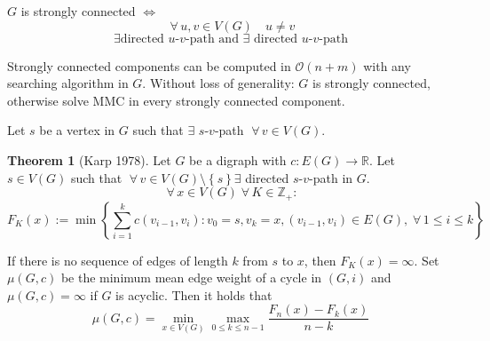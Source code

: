 \documentclass[a4paper]{article}
\theoremstyle{definition}
\newtheorem{theorem}{Theorem}
\newcommand{\set}[1]{\left\{#1\right\}}
\newcommand{\gath}[2]{$#1$-$#2$-path} %
\newcommand{\fall}{\;\forall\,}
\begin{document}
 $G$ is strongly connected $\Leftrightarrow$
\[
  \fall u, v \in V(G) \quad u \neq v
\] \[
  \exists \text{directed \gath uv and } \exists \text{ directed \gath uv}
\]

Strongly connected components can be computed in $\mathcal{O}(n + m)$ with any searching algorithm in $G$. Without loss of generality: $G$ is strongly connected, otherwise solve MMC in every strongly connected component.

Let $s$ be a vertex in $G$ such that $\exists$ \gath sv $\fall v \in V(G)$.

\begin{theorem}[Karp 1978]
  \label{satz-3.10}
  Let $G$ be a digraph with $c: E(G) \rightarrow \mathbb{R}$. Let $s \in V(G)$ such that $\fall v \in V(G) \setminus \set{s} \exists$ directed \gath sv in $G$.
  \[
    \fall x \in V(G) \fall K \in \mathbb{Z}_+:
  \] \[
    F_K(x) := \min\set{
      \sum_{i=1}^k c(v_{i-1}, v_i):
        v_0 = s, v_k = x, (v_{i-1}, v_i) \in E(G),
        \fall 1 \leq i \leq k
    }
  \]

  If there is no sequence of edges of length $k$ from $s$ to $x$, then $F_K(x) = \infty$.
  Set $\mu(G, c)$ be the minimum mean edge weight of a cycle in $(G, i)$ and $\mu(G, c) = \infty$ if $G$ is acyclic. Then it holds that
  \[
    \mu(G, c) = \min_{x \in V(G)} \max_{0 \leq k \leq n-1} \frac{F_n(x) - F_k(x)}{n-k}
  \]
\end{theorem}
\end{document}
